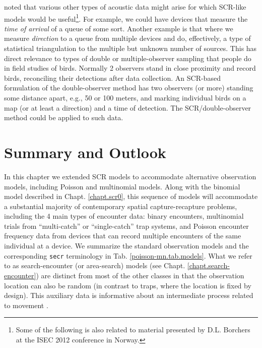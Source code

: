 \citet{efford_dawson:2010} noted that various other types of acoustic
data might arise for which SCR-like models would be
useful\footnote{Some of the following is also related to material
  presented by D.L. Borchers at the ISEC 2012 conference in Norway.}.
For example, we could have devices that measure the {\it time of
  arrival} of a queue of some sort.
Another example is that where we measure {\it direction} to a queue
from multiple devices and do, effectively, a type of statistical
triangulation to the multiple but unknown number of sources.  This has
direct relevance to types of double or multiple-observer sampling that
people do in field studies of birds. Normally 2 observers stand in
close proximity and record birds, reconciling their detections after
data collection. An SCR-based formulation of the double-observer
method has two observers (or more) standing some distance apart, e.g.,
50 or 100 meters,  and marking individual birds on a map (or at
least a direction) and a time of detection.  The SCR/double-observer
method could be applied to such data.



\section{Summary and Outlook}

In this chapter we extended SCR models to accommodate alternative
observation models, including Poisson and multinomial models.  Along
with the binomial model described in Chapt. \ref{chapt.scr0}, this
sequence of models will accommodate a substantial majority of
contemporary spatial capture-recapture problems, including
the 4 main types of encounter data: 
binary encounters, multinomial trials from ``multi-catch'' or
``single-catch'' \citep{efford:2004, efford:2011, royle_gardner:2011}
trap systems, and Poisson encounter frequency data from devices that can
record multiple encounters of the same individual at a device.  We
summarize the standard observation models and the corresponding
\mbox{\tt secr} terminology in Tab. \ref{poisson-mn.tab.models}.  What
we refer to as search-encounter (or area-search) models (see
Chapt. \ref{chapt.search-encounter}) are distinct
from most of the other classes in that the observation location can
also be random (in contrast to traps, where the location is fixed by
design). This auxiliary data is informative about an intermediate
process related to movement \citep{royle_young:2008}.

